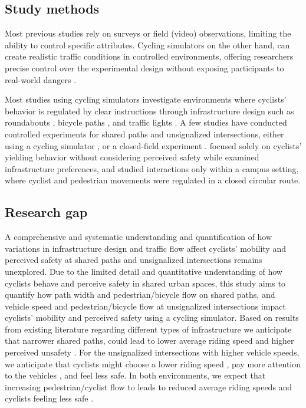\documentclass[3p,authoryear]{elsarticle}
\begin{document}
\subsection{Study methods}
Most previous studies rely on surveys or field (video) observations, limiting the
ability to control specific attributes. Cycling simulators on the other hand,
can create realistic traffic conditions in controlled environments, offering
researchers precise control over the experimental design without exposing
participants to real-world dangers
\citep{cobb2021bicyclists,ohern2017validation,meuleners2015validation}.

Most studies using cycling simulators investigate environments where cyclists'
behavior is regulated by clear instructions through infrastructure design such
as roundabouts \citep{friel2023cyclists,zeuwts2023using,xu2023assessing},
bicycle paths \citep{mohammadi2024understanding,guo2023psycho,%
meuleners2023improving,nazemi2021studying,bogacz2020comparison}, and traffic
lights \citep{friel2023cyclists,scottdeeter2023assessing,zeuwts2023using,%
xu2023assessing,cobb2021bicyclists,kwigizile2017real,liu2012response}. A few
studies have conducted controlled experiments for shared paths and unsignalized
intersections, either using a cycling simulator
\citep{mohammadi2024understanding,berghoefer2023prefer}, or a closed-field
experiment \citep{huang2021investigating}.
\citet{mohammadi2024understanding} focused solely on cyclists' yielding behavior
without considering perceived safety while \citet*{berghoefer2023prefer} examined
infrastructure preferences, and \citet{huang2021investigating} studied
interactions only within a campus setting, where cyclist and pedestrian
movements were regulated in a closed circular route.

\subsection{Research gap}
A comprehensive and systematic understanding and quantification of how
variations in infrastructure design and traffic flow affect cyclists' mobility
and perceived safety at shared paths and unsignalized intersections remains
unexplored. Due to the limited detail and quantitative understanding of how
cyclists behave and perceive safety in shared urban spaces, this study aims to
quantify how path width and pedestrian/bicycle flow on shared paths, and vehicle
speed and pedestrian/bicycle flow at unsignalized intersections impact cyclists'
mobility and perceived safety using a cycling simulator. Based on results from
existing literature regarding different types of infrastructure we anticipate
that narrower shared paths, could lead to lower average riding speed
\citep{boufous2018impact} and higher perceived unsafety
\citep{gkekas2020perceived}. For the unsignalized intersections with higher
vehicle speeds, we anticipate that cyclists might choose a lower riding speed
\citep{mohammadi2023how,mohammadi2024understanding}, pay more attention to the
vehicles \citep{mohammadi2024understanding}, and feel less safe. In both
environments, we expect that increasing pedestrian/cyclist flow to leads to
reduced average riding speeds and cyclists feeling less safe
\citep{huang2021investigating,beitel2018assessing,boufous2018impact,essa2018road}.
\end{document}
